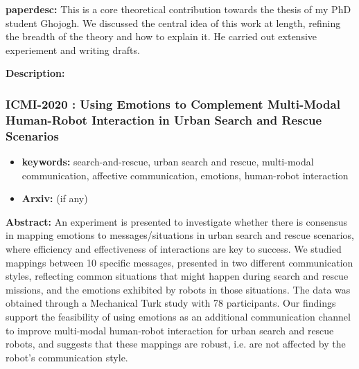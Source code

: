 \documentclass{article}
\begin{document}
\textbf{paperdesc:} This is a core theoretical contribution towards the thesis of my PhD student Ghojogh. We discussed the central idea of this work at length, refining the breadth of the theory and how to explain it. He carried out extensive experiement and writing drafts.

\textbf{Description:} 



\newpage
\subsubsection{\textbf{ICMI-2020} : Using Emotions to Complement Multi-Modal Human-Robot Interaction in Urban Search and Rescue Scenarios}
\begin{itemize}
\item \textbf{keywords:} search-and-rescue, urban search and rescue, multi-modal communication, affective communication, emotions, human-robot interaction
\item \textbf{Arxiv:}  (if any)
\end{itemize}


\textbf{Abstract:} An experiment is presented to investigate whether there is consensus in mapping emotions to messages/situations in urban search and rescue scenarios, where efficiency and effectiveness of interactions are key to success. We studied mappings between 10 specific messages, presented in two different communication styles, reflecting common situations that might happen during search and rescue missions, and the emotions exhibited by robots in those situations. The data was obtained through a Mechanical Turk study with 78 participants. Our findings support the feasibility of using emotions as an additional communication channel to improve multi-modal human-robot interaction for urban search and rescue robots, and suggests that these mappings are robust, i.e. are not affected by the robot's communication style.
\end{document}
